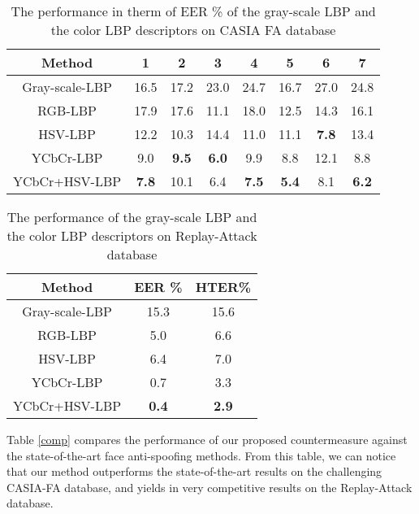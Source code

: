 \documentclass{article}
\begin{document}
\vspace{-4mm}
\begin{table}[h]
\small
		\centering
	\caption{The performance in therm of EER \% of the gray-scale LBP and the color LBP descriptors on CASIA FA database}
	 \label{perf_casia}
		\setlength{\tabcolsep}{0.14cm}
		\begin{tabular}{|c|c|c|c|c|c|c|c|}
			\hline
			Method & 1 & 2& 3& 4 & 5 & 6& 7\\
			\hline \hline
			Gray-scale-LBP& 16.5& 17.2 & 23.0& 24.7 &16.7& 27.0 &24.8\\
					\hline 
			RGB-LBP& 17.9 & 17.6 & 11.1 & 18.0& 12.5 & 14.3&16.1\\
			\hline 
			HSV-LBP& 12.2 & 10.3& 14.4 & 11.0 &11.1  & \textbf{7.8}&13.4\\
			\hline 
			YCbCr-LBP& 9.0 & \textbf{9.5 }&\textbf{6.0} & 9.9&8.8  & 12.1 &8.8 \\
			\hline
			\hline
			YCbCr+HSV-LBP& \textbf{7.8}& 10.1 &6.4 &\textbf{ 7.5} &\textbf{5.4}  & 8.1 &\textbf{6.2}\\
			\hline 			
	 \end{tabular}	
	\end{table} 	
	\vspace{-6mm}
		\begin{table}[h]
		\small
			\centering
	\caption{The performance of the gray-scale LBP and the color LBP descriptors on Replay-Attack database}
\label{perf_replay}
	\setlength{\tabcolsep}{0.7cm}
		\begin{tabular}{|c|c|c|}
			\hline
	    Method & EER \%& HTER\%\\
			\hline \hline
			Gray-scale-LBP&15.3 &15.6 \\
					\hline 
			RGB-LBP& 5.0 & 6.6 \\
			\hline 
			HSV-LBP&6.4  & 7.0 \\
			\hline 
			YCbCr-LBP&  0.7 & 3.3 \\
			\hline 
			\hline
			YCbCr+HSV-LBP&  \textbf{0.4} & \textbf{2.9} \\
			\hline
	 \end{tabular}	
	\end{table}  
	
Table \ref{comp} compares the performance of our proposed countermeasure against the state-of-the-art face anti-spoofing methods. From this table, we can notice that our method outperforms the state-of-the-art results on the challenging CASIA-FA database, and yields in very competitive results on the Replay-Attack database.
	
\end{document}
